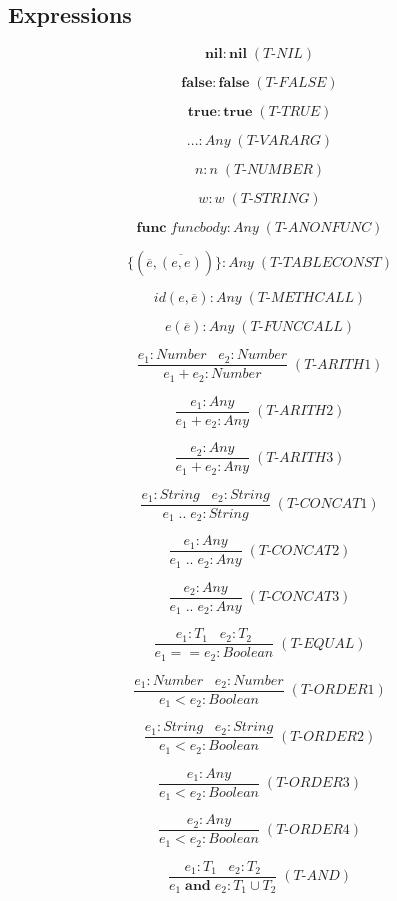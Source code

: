 \documentclass[12pt]{article}
\begin{document}
\subsection{Expressions}

\[
\textbf{nil} : \textbf{nil} \; (\textit{T-NIL})
\]

\[
\textbf{false} : \textbf{false} \; (\textit{T-FALSE})
\]

\[
\textbf{true} : \textbf{true} \; (\textit{T-TRUE})
\]

\[
{...} : Any \; (\textit{T-VARARG})
\]

\[
n : n \; (\textit{T-NUMBER})
\]

\[
w : w \; (\textit{T-STRING})
\]

\[
\textbf{func} \; funcbody : Any \; (\textit{T-ANONFUNC})
\]

\[
\{(\overline{e},\overline{(e,e)})\} : Any \; (\textit{T-TABLECONST})
\]

\[
id(e,\overline{e}) : Any \; (\textit{T-METHCALL})
\]

\[
e(\overline{e}) : Any \; (\textit{T-FUNCCALL})
\]

\[
\frac{e_{1}:Number \;\;\; e_{2}:Number}
     {e_{1} + e_{2} : Number} \; (\textit{T-ARITH1})
\]

\[
\frac{e_{1}:Any}
     {e_{1} + e_{2} : Any} \; (\textit{T-ARITH2})
\]

\[
\frac{e_{2}:Any}
     {e_{1} + e_{2} : Any} \; (\textit{T-ARITH3})
\]

\[
\frac{e_{1}:String \;\;\; e_{2}:String}
     {e_{1} \; {..} \; e_{2} : String} \; (\textit{T-CONCAT1})
\]

\[
\frac{e_{1}:Any}
     {e_{1} \; {..} \; e_{2} : Any} \; (\textit{T-CONCAT2})
\]

\[
\frac{e_{2}:Any}
     {e_{1} \; {..} \; e_{2} : Any} \; (\textit{T-CONCAT3})
\]

\[
\frac{e_{1}:T_{1} \;\;\; e_{2}:T_{2}}
     {e_{1} == e_{2} : Boolean} \; (\textit{T-EQUAL})
\]

\[
\frac{e_{1}:Number \;\;\; e_{2}:Number}
     {e_{1} < e_{2} : Boolean} \; (\textit{T-ORDER1})
\]

\[
\frac{e_{1}:String \;\;\; e_{2}:String}
     {e_{1} < e_{2} : Boolean} \; (\textit{T-ORDER2})
\]

\[
\frac{e_{1}:Any}
     {e_{1} < e_{2} : Boolean} \; (\textit{T-ORDER3})
\]

\[
\frac{e_{2}:Any}
     {e_{1} < e_{2} : Boolean} \; (\textit{T-ORDER4})
\]

\[
\frac{e_{1}:T_{1} \;\;\; e_{2}:T_{2}}
     {e_{1} \; \textbf{and} \; e_{2} : T_{1} \cup T_{2}} \; (\textit{T-AND})
\]
\end{document}

